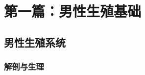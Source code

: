 \vspace{2cm}

\tableofcontents
\listoffigures
\listoftables

\part*{第一篇：男性生殖基础}

\chapter{男性生殖系统}

\section{解剖与生理}

